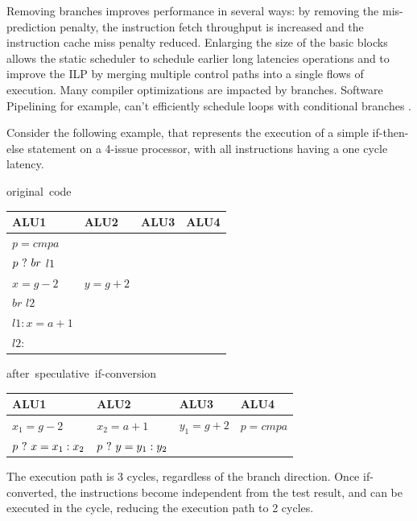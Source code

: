 Removing branches improves performance in several ways: by removing the mis-prediction penalty, the instruction fetch throughput is increased and the instruction cache miss penalty reduced. Enlarging the size of the basic blocks allows the static scheduler to schedule earlier long latencies operations and to improve the ILP by merging multiple control paths into a single flows of execution. Many compiler optimizations are impacted by branches. Software Pipelining for example, can't efficiently schedule loops with conditional branches \cite{Warter:1992:EMS:144953.145796}.

Consider the following example, that represents the execution of a simple if-then-else statement on a 4-issue processor, with all instructions having a one cycle latency.

\begin{table}[ht]
\begin{minipage}[t]{.4\linewidth}
\centering
 \mbox{original code} \\
   \begin{tabular}{| l | l | l | l | }
    \hline
ALU1 & ALU2 & ALU3 & ALU4 \\
    \hline
$ p = cmp a $ & & & \\
$ p ~?~ br$ $l1$ & & & \\
$ x = g - 2 $ & $ y = g + 2 $ & & \\
$ br$ $ l2 $ & & & \\
$ l1: x = a + 1 $ & & & \\
$ l2: $ & & & \\
    \hline
    \end{tabular}
\end{minipage}
\begin{minipage}[t]{.4\linewidth}
\centering
\mbox{after speculative if-conversion} \\
    \begin{tabular}{| l | l | l | l | }
    \hline
ALU1 & ALU2 & ALU3 & ALU4 \\
    \hline
$ x_1 = g - 2 $ & $ x_2 = a + 1 $ & $y_1 = g + 2 $ & $ p = cmp a $ \\
$ p ~?~ x = x_1 : x_2 $ & $ p ~?~ y = y_1 : y_2 $ & & \\
    \hline
    \end{tabular}
\end{minipage}
\end{table}

The execution path is 3 cycles, regardless of the branch direction. Once if-converted, the instructions become independent from the test result, and can be executed in the cycle, reducing the execution path to 2 cycles.

